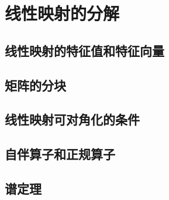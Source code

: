 \documentclass[12pt, a4paper, oneside, UTF8]{ctexbook}
\begin{document}
% 
\else
\fi
\chapter{线性映射的分解}
	\section{线性映射的特征值和特征向量}
    \section{矩阵的分块}
	\section{线性映射可对角化的条件}
	\section{自伴算子和正规算子}
	\section{谱定理}
\ifx\allfiles\undefined
\end{document}
